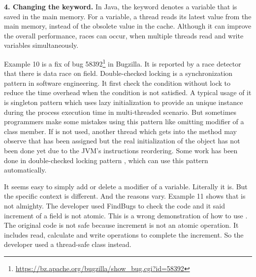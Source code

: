 


\noindent
\textbf{4. Changing the  keyword.} In Java, the  keyword denotes a variable that is saved in the main memory. For a  variable, a thread reads its latest value from the main memory, instead of the obsolete  value in the cache. Although it can improve the overall performance, races can occur, when multiple threads read and write  variables simultaneously.


Example 10 is a fix of bug 58392\footnote{\url{https://bz.apache.org/bugzilla/show_bug.cgi?id=58392}} in Bugzilla. It is reported by a race detector that there is data race on field. Double-checked locking is a synchronization pattern in software engineering. It first check the condition without lock to reduce the time overhead when the condition is not satisfied. A typical usage of it is singleton pattern which uses lazy initialization to provide an unique instance during the process execution time in multi-threaded scenario. But sometimes programmers make some mistakes using this pattern like omitting  modifier of a class member. If  is not used, another thread which gets into the method may observe that  has been assigned but the real initialization of the object has not been done yet due to the JVM's instructions reordering. Some work has been done in double-checked locking pattern \cite{conf/ispass/IshizakiDN14}, which can use this pattern automatically.



It seems easy to simply add or delete a  modifier of a variable. Literally it is. But the specific context is different. And the reasons vary. Example 11 shows that  is not almighty. The developer used FindBugs to check the code and it said increment of a  field is not atomic. This is a wrong demonstration of how to use . The original code is not safe because increment is not an atomic operation. It includes read, calculate and write operations to complete the increment. So the developer used a thread-safe class instead.

